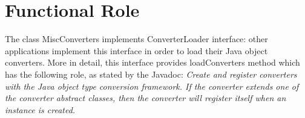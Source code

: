 \section{Functional Role}
The class MiscConverters implements ConverterLoader interface: other applications implement this interface in order to load their Java object converters. More in detail, this interface provides loadConverters method which has the following role, as stated by the Javadoc: \textit{Create and register converters with the Java object type conversion framework. If the converter extends one of the converter abstract classes, then the converter will register itself when an instance is created.}